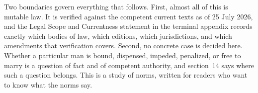 Two boundaries govern everything that follows. First, almost all of this is mutable law. It is verified against the competent current texts as of 25 July 2026, and the Legal Scope and Currentness statement in the terminal appendix records exactly which bodies of law, which editions, which jurisdictions, and which amendments that verification covers. Second, no concrete case is decided here. Whether a particular man is bound, dispensed, impeded, penalized, or free to marry is a question of fact and of competent authority, and section~14 says where such a question belongs. This is a study of norms, written for readers who want to know what the norms say.
